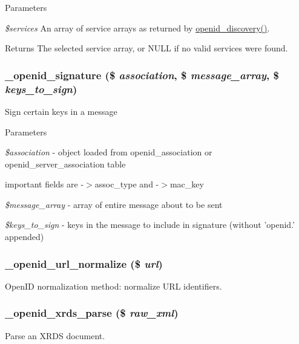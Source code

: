 \begin{DoxyParams}{Parameters}
\item[{\em \$services}]An array of service arrays as returned by \hyperlink{openid_8module_ae52417e5179c251a3256583ea3e67d30}{openid\_\-discovery()}. \end{DoxyParams}
\begin{DoxyReturn}{Returns}
The selected service array, or NULL if no valid services were found. 
\end{DoxyReturn}
\hypertarget{openid_8inc_a94a239a1dacef65306d0078198035cc7}{
\subsubsection[{\_\-openid\_\-signature}]{\setlength{\rightskip}{0pt plus 5cm}\_\-openid\_\-signature (\$ {\em association}, \/  \$ {\em message\_\-array}, \/  \$ {\em keys\_\-to\_\-sign})}}
\label{openid_8inc_a94a239a1dacef65306d0078198035cc7}
Sign certain keys in a message 
\begin{DoxyParams}{Parameters}
\item[{\em \$association}]-\/ object loaded from openid\_\-association or openid\_\-server\_\-association table
\begin{DoxyItemize}
\item important fields are -\/$>$assoc\_\-type and -\/$>$mac\_\-key 
\end{DoxyItemize}\item[{\em \$message\_\-array}]-\/ array of entire message about to be sent \item[{\em \$keys\_\-to\_\-sign}]-\/ keys in the message to include in signature (without 'openid.' appended) \end{DoxyParams}
\hypertarget{openid_8inc_a19b00511427ad7985408f16c079a2546}{
\subsubsection[{\_\-openid\_\-url\_\-normalize}]{\setlength{\rightskip}{0pt plus 5cm}\_\-openid\_\-url\_\-normalize (\$ {\em url})}}
\label{openid_8inc_a19b00511427ad7985408f16c079a2546}
OpenID normalization method: normalize URL identifiers. \hypertarget{openid_8inc_a3ef1c9170e34e325cc88371a06928a0f}{
\subsubsection[{\_\-openid\_\-xrds\_\-parse}]{\setlength{\rightskip}{0pt plus 5cm}\_\-openid\_\-xrds\_\-parse (\$ {\em raw\_\-xml})}}
\label{openid_8inc_a3ef1c9170e34e325cc88371a06928a0f}
Parse an XRDS document.


